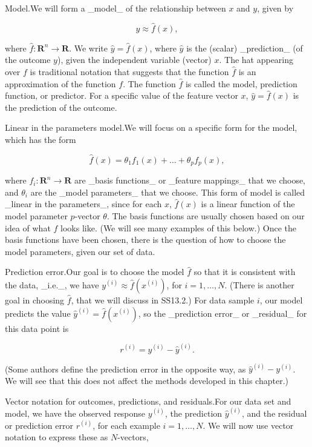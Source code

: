 Model.We will form a _model_ of the relationship between \(x\) and \(y\), given by

\[y\approx\hat{f}(x),\]

where \(\hat{f}:\mathbf{R}^{n}\to\mathbf{R}\). We write \(\hat{y}=\hat{f}(x)\), where \(\hat{y}\) is the (scalar) _prediction_ (of the outcome \(y\)), given the independent variable (vector) \(x\). The hat appearing over \(f\) is traditional notation that suggests that the function \(\hat{f}\) is an approximation of the function \(f\). The function \(\hat{f}\) is called the model, prediction function, or predictor. For a specific value of the feature vector \(x\), \(\hat{y}=\hat{f}(x)\) is the prediction of the outcome.

Linear in the parameters model.We will focus on a specific form for the model, which has the form

\[\hat{f}(x)=\theta_{1}f_{1}(x)+\dots+\theta_{p}f_{p}(x),\]

where \(f_{i}:\mathbf{R}^{n}\to\mathbf{R}\) are _basis functions_ or _feature mappings_ that we choose, and \(\theta_{i}\) are the _model parameters_ that we choose. This form of model is called _linear in the parameters_, since for each \(x\), \(\hat{f}(x)\) is a linear function of the model parameter \(p\)-vector \(\theta\). The basis functions are usually chosen based on our idea of what \(f\) looks like. (We will see many examples of this below.) Once the basis functions have been chosen, there is the question of how to choose the model parameters, given our set of data.

Prediction error.Our goal is to choose the model \(\hat{f}\) so that it is consistent with the data, _i.e._, we have \(y^{(i)}\approx\hat{f}(x^{(i)})\), for \(i=1,\dots,N\). (There is another goal in choosing \(\hat{f}\), that we will discuss in SS13.2.) For data sample \(i\), our model predicts the value \(\hat{y}^{(i)}=\hat{f}(x^{(i)})\), so the _prediction error_ or _residual_ for this data point is

\[r^{(i)}=y^{(i)}-\hat{y}^{(i)}.\]

(Some authors define the prediction error in the opposite way, as \(\hat{y}^{(i)}-y^{(i)}\). We will see that this does not affect the methods developed in this chapter.)

Vector notation for outcomes, predictions, and residuals.For our data set and model, we have the observed response \(y^{(i)}\), the prediction \(\hat{y}^{(i)}\), and the residual or prediction error \(r^{(i)}\), for each example \(i=1,\dots,N\). We will now use vector notation to express these as \(N\)-vectors,

